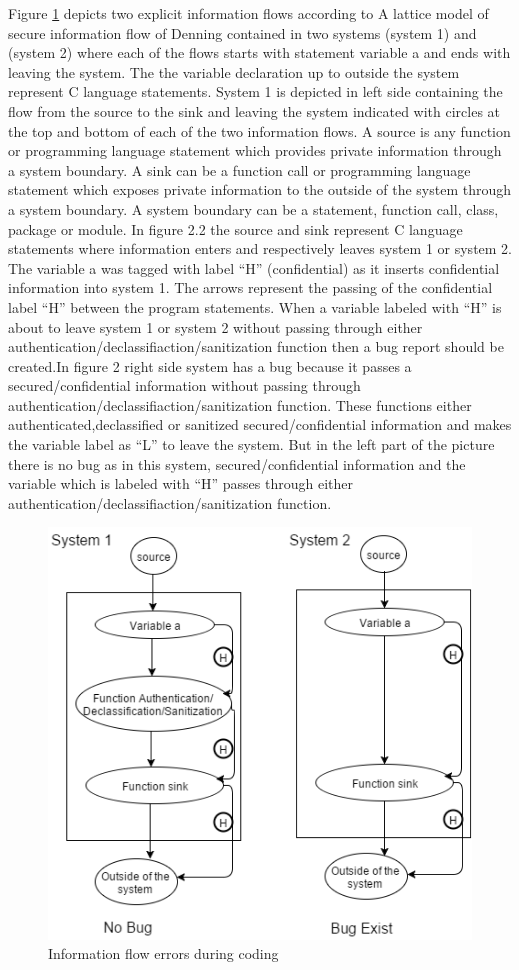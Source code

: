 Figure \ref{figure_bug_detection_during_coding} depicts two explicit information flows according to A lattice model of secure information flow of Denning \cite{ref_14_denning1976lattice} contained in two systems (system 1) and (system 2)
where each of the flows starts with statement variable a and ends with leaving the system. The the variable declaration up to outside the system represent C language statements. System 1 is depicted in left side containing the flow from the source to the sink and leaving the system indicated with circles at the top and bottom of each of the
two information flows. A source is any function or programming language statement which provides private information through a system boundary. A sink can be a function call or programming language statement which exposes private information to the outside of the system through a system boundary. A system boundary can be a statement, function call, class, package or module. In figure 2.2 the source and sink represent C language statements where information enters and respectively leaves system 1 or system 2. The variable a was tagged with label \enquote{H} (confidential) as it inserts confidential information into system 1. The arrows represent the passing of the confidential label \enquote{H} between the program statements. When a variable labeled with \enquote{H} is about to leave system 1 or system 2 without passing through either authentication/declassifiaction/sanitization function then a bug report should be created.In figure 2 right side system has a bug because it passes a secured/confidential information without passing through authentication/declassifiaction/sanitization function. These functions either authenticated,declassified or sanitized  secured/confidential information and makes the variable label as \enquote{L} to leave the system. But in the left part of the picture there is no bug as in this system, secured/confidential information and the variable which is labeled with \enquote{H} passes through either authentication/declassifiaction/sanitization function.

\begin{figure}[htbp]
	\centering
	\includegraphics{styles/bug_detection_during_coding.png}
	\caption{Information flow errors during coding}
	\label{figure_bug_detection_during_coding}
\end{figure}
